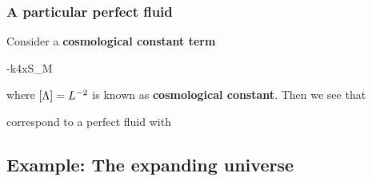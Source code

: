 \documentclass[../main/main.tex]{subfiles}
\begin{document}
\subsubsection{A particular perfect fluid}

Consider a \textbf{cosmological constant term}
\begin{eqalign}
	-\frac\Lambda k\int\diff4x\subset S_M
\end{eqalign}
where $\left[\Lambda\right] = L^{-2}$ is known as \textbf{cosmological constant}. Then we see that
\begin{eqalign}\end{eqalign}
correspond to a perfect fluid with
\begin{eqalign}\end{eqalign}

\subsection{Example: The expanding universe}
\end{document}
